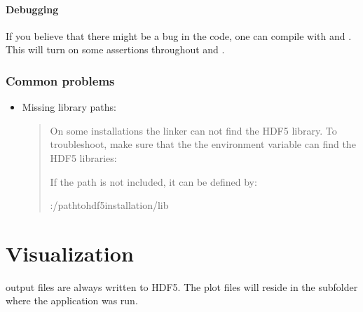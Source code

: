 \documentclass[letterpaper,10pt,english]{sphinxmanual}
\begin{document}
\paragraph{Debugging}
\label{\detokenize{Base/Installation:debugging}}
\sphinxAtStartPar
If you believe that there might be a bug in the code, one can compile with  and .
This will turn on some assertions throughout  and .


\subsubsection{Common problems}
\label{\detokenize{Base/Installation:common-problems}}\begin{itemize}
\item {} 
\sphinxAtStartPar
Missing library paths:
\begin{quote}

\sphinxAtStartPar
On some installations the linker can not find the HDF5 library.
To troubleshoot, make sure that the the environment variable  can find the HDF5 libraries:

\begin{sphinxVerbatim}[commandchars=\\\{\},formatcom=\scriptsize]
 
\end{sphinxVerbatim}

\sphinxAtStartPar
If the path is not included, it can be defined by:

\begin{sphinxVerbatim}[commandchars=\\\{\},formatcom=\scriptsize]
 :/\PYGZlt{}path\PYGZus{}to\PYGZus{}hdf5\PYGZus{}installation\PYGZgt{}/lib
\end{sphinxVerbatim}
\end{quote}

\end{itemize}

\sphinxstepscope


\section{Visualization}
\label{\detokenize{Base/Visualization:visualization}}\label{\detokenize{Base/Visualization:chap-visualization}}\label{\detokenize{Base/Visualization::doc}}
\sphinxAtStartPar
{} output files are always written to HDF5.
The plot files will reside in the  subfolder where the application was run.
\end{document}
